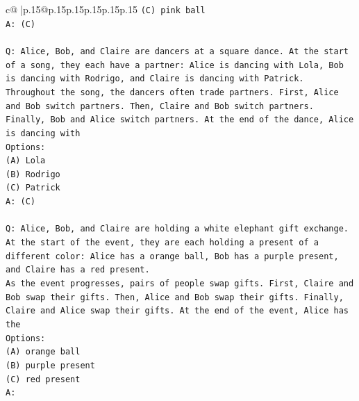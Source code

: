\documentclass{article}
\begin{document}
{\begin{supertabular}{c@{$\;$}|p{.15\linewidth}@{}p{.15\linewidth}p{.15\linewidth}p{.15\linewidth}p{.15\linewidth}p{.15\linewidth}}
{{{\texttt{(C) pink ball} \\
\texttt{A: (C)} \\
\\ 
\texttt{Q: Alice, Bob, and Claire are dancers at a square dance. At the start of a song, they each have a partner: Alice is dancing with Lola, Bob is dancing with Rodrigo, and Claire is dancing with Patrick.} \\
\texttt{Throughout the song, the dancers often trade partners. First, Alice and Bob switch partners. Then, Claire and Bob switch partners. Finally, Bob and Alice switch partners. At the end of the dance, Alice is dancing with} \\
\texttt{Options:} \\
\texttt{(A) Lola} \\
\texttt{(B) Rodrigo} \\
\texttt{(C) Patrick} \\
\texttt{A: (C)} \\
\\ 
\texttt{Q: Alice, Bob, and Claire are holding a white elephant gift exchange. At the start of the event, they are each holding a present of a different color: Alice has a orange ball, Bob has a purple present, and Claire has a red present.} \\
\texttt{As the event progresses, pairs of people swap gifts. First, Claire and Bob swap their gifts. Then, Alice and Bob swap their gifts. Finally, Claire and Alice swap their gifts. At the end of the event, Alice has the} \\
\texttt{Options:} \\
\texttt{(A) orange ball} \\
\texttt{(B) purple present} \\
\texttt{(C) red present} \\
\texttt{A:} \\
            }
        }
    }
     \\ \\


\end{supertabular}}
\end{document}
